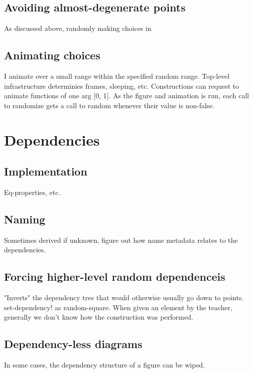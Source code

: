 \subsection{Avoiding almost-degenerate points}

As discussed above, randomly making choices in

\subsection{Animating choices}

I animate over a small range within the specified random
range. Top-level infrastructure determinies frames, sleeping, etc.
Constructions can request to animate functions of one arg [0, 1]. As
the figure and animation is run, each call to randomize gets a call to
random whenever their value is non-false.

\section{Dependencies}

\subsection{Implementation}

Eq-properties, etc.

\subsection{Naming}

Sometimes derived if unknown, figure out how name metadata relates to
the dependencies.

\subsection{Forcing higher-level random dependenceis}

"Inverts" the dependency tree that would otherwise usually go
down to points. set-dependency! as random-square. When given an
element by the teacher, generally we don't know how the construction
was performed.

\subsection{Dependency-less diagrams}

In some cases, the dependency structure of a figure can be wiped.

